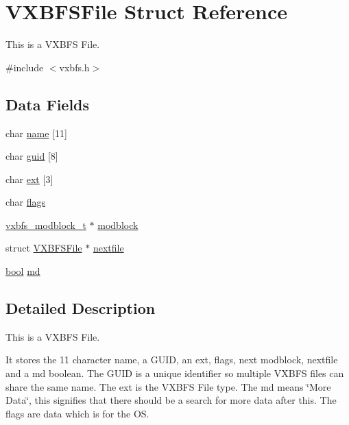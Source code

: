 \hypertarget{a00332}{}\section{V\+X\+B\+F\+S\+File Struct Reference}
\label{a00332}


This is a V\+X\+B\+FS File.  




{\ttfamily \#include $<$vxbfs.\+h$>$}

\subsection*{Data Fields}
\begin{DoxyCompactItemize}
\item 
char \hyperlink{a00332_a07ecc9bacdc2943442f26f62f6749055_a07ecc9bacdc2943442f26f62f6749055}{name} \mbox{[}11\mbox{]}
\item 
char \hyperlink{a00332_a03b954de114d8e01bb783ddef964e8ca_a03b954de114d8e01bb783ddef964e8ca}{guid} \mbox{[}8\mbox{]}
\item 
char \hyperlink{a00332_ad030f5719e51b0b41b7cb6047f4110b2_ad030f5719e51b0b41b7cb6047f4110b2}{ext} \mbox{[}3\mbox{]}
\item 
char \hyperlink{a00332_a8fc3bc64d7f2330f923507d2430bdde4_a8fc3bc64d7f2330f923507d2430bdde4}{flags}
\item 
\hyperlink{a00206_a0774a42f7a124b6d3054ccabd4d35463_a0774a42f7a124b6d3054ccabd4d35463}{vxbfs\+\_\+modblock\+\_\+t} $\ast$ \hyperlink{a00332_ac0784f3fae88428f37dfb64fd79c0004_ac0784f3fae88428f37dfb64fd79c0004}{modblock}
\item 
struct \hyperlink{a00332}{V\+X\+B\+F\+S\+File} $\ast$ \hyperlink{a00332_aa2c7e2e1b3827ce9fbaa045b89202784_aa2c7e2e1b3827ce9fbaa045b89202784}{nextfile}
\item 
\hyperlink{a00140_af6a258d8f3ee5206d682d799316314b1_af6a258d8f3ee5206d682d799316314b1}{bool} \hyperlink{a00332_adb380ce440ec23ef6c9c06d871be3c0d_adb380ce440ec23ef6c9c06d871be3c0d}{md}
\end{DoxyCompactItemize}


\subsection{Detailed Description}
This is a V\+X\+B\+FS File. 

It stores the 11 character name, a G\+U\+ID, an ext, flags, next modblock, nextfile and a md boolean. The G\+U\+ID is a unique identifier so multiple V\+X\+B\+FS files can share the same name. The ext is the V\+X\+B\+FS File type. The md means \char`\"{}\+More Data\char`\"{}, this signifies that there should be a search for more data after this. The flags are data which is for the OS. 

